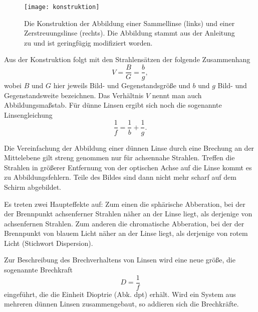 \begin{figure}
  \centering
  \texttt{[image: konstruktion]}
  \caption{Die Konstruktion der Abbildung einer Sammellinse (links) und
    einer Zerstreuungslinse (rechts). Die Abbildung stammt aus der
    Anleitung zu \textcite{v408} und ist geringfügig modifiziert
    worden.}
  \label{fig:konstruktion}
\end{figure}

Aus der Konstruktion folgt mit den Strahlensätzen der folgende
Zusammenhang
%
\begin{equation}
  \label{eq:abbildungsmassstab}
  V = \frac{B}{G} = \frac{b}{g},
\end{equation}
%
wobei $B$ und $G$ hier jeweils Bild- und Gegenstandsgröße und $b$ und
$g$ Bild- und Gegenstandsweite bezeichnen.  Das Verhältnis $V$ nennt man
auch Abbildungsmaßstab.  Für dünne Linsen ergibt sich noch die
sogenannte Linsengleichung
%
\begin{equation}
  \label{eq:linsengleichung}
  \frac{1}{f} = \frac{1}{b} + \frac{1}{g}.
\end{equation}

Die Vereinfachung der Abbildung einer dünnen Linse durch eine Brechung
an der Mittelebene gilt streng genommen nur für achsennahe Strahlen.
Treffen die Strahlen in größerer Entfernung von der optischen Achse auf
die Linse kommt es zu Abbildungsfehlern.  Teile des Bildes sind dann
nicht mehr scharf auf dem Schirm abgebildet.

Es treten zwei Haupteffekte auf: Zum einen die sphärische Abberation,
bei der der Brennpunkt achsenferner Strahlen näher an der Linse liegt,
als derjenige von achsenfernen Strahlen. Zum anderen die chromatische
Abberation, bei der der Brennpunkt von blauem Licht näher an der Linse
liegt, als derjenige von rotem Licht (Stichwort Dispersion).

Zur Beschreibung des Brechverhaltens von Linsen wird eine neue
größe, die sogenannte Brechkraft 
%
\begin{equation}
  \label{eq:brechkraft}
  D = \frac{1}{f}
\end{equation}
%
eingeführt, die die Einheit Dioptrie (Abk. dpt) erhält. Wird ein System
aus mehreren dünnen Linsen zusammengebaut, so addieren sich die
Brechkräfte.
